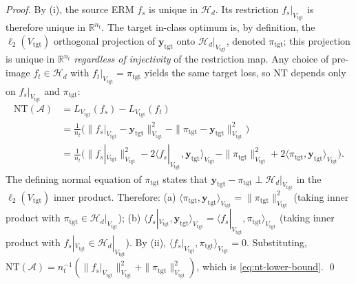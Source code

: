 \documentclass[11pt,a4paper]{article}
\theoremstyle{plain}
\theoremstyle{definition}
\theoremstyle{remark}
\newcommand{\by}{\mathbf{y}}
\newcommand{\R}{\mathbb{R}}
\newcommand{\Acal}{\mathcal{A}}
\newcommand{\Hcal}{\mathcal{H}}
\begin{document}
\begin{proof}
By (i), the source ERM $f_s$ is unique in $\Hcal_d$. Its
restriction $f_s|_{V_{\mathrm{tgt}}}$ is therefore unique in
$\R^{n_t}$. The target in-class optimum is, by definition, the
$\ell_2(V_{\mathrm{tgt}})$ orthogonal projection of
$\by_{\mathrm{tgt}}$ onto $\Hcal_d|_{V_{\mathrm{tgt}}}$, denoted
$\pi_{\mathrm{tgt}}$; this projection is unique in $\R^{n_t}$
\emph{regardless of injectivity} of the restriction map. Any
choice of pre-image $f_t \in \Hcal_d$ with $f_t|_{V_{\mathrm{tgt}}}
= \pi_{\mathrm{tgt}}$ yields the same target loss, so $\mathrm{NT}$
depends only on $f_s|_{V_{\mathrm{tgt}}}$ and $\pi_{\mathrm{tgt}}$:
\begin{align*}
    \mathrm{NT}(\Acal)
    &= L_{V_{\mathrm{tgt}}}(f_s) - L_{V_{\mathrm{tgt}}}(f_t)\\
    &= \frac{1}{n_t}\Big(
        \|f_s|_{V_{\mathrm{tgt}}} - \by_{\mathrm{tgt}}\|^2_{V_{\mathrm{tgt}}}
        - \|\pi_{\mathrm{tgt}} - \by_{\mathrm{tgt}}\|^2_{V_{\mathrm{tgt}}}
        \Big)\\
    &= \frac{1}{n_t}\Big(
        \|f_s|_{V_{\mathrm{tgt}}}\|^2_{V_{\mathrm{tgt}}}
        - 2\langle f_s|_{V_{\mathrm{tgt}}}, \by_{\mathrm{tgt}}\rangle_{V_{\mathrm{tgt}}}
        - \|\pi_{\mathrm{tgt}}\|^2_{V_{\mathrm{tgt}}}
        + 2\langle \pi_{\mathrm{tgt}}, \by_{\mathrm{tgt}}\rangle_{V_{\mathrm{tgt}}}
        \Big).
\end{align*}
The defining normal equation of $\pi_{\mathrm{tgt}}$ states that
$\by_{\mathrm{tgt}} - \pi_{\mathrm{tgt}} \perp
\Hcal_d|_{V_{\mathrm{tgt}}}$ in the
$\ell_2(V_{\mathrm{tgt}})$ inner product. Therefore:
(a) $\langle \pi_{\mathrm{tgt}}, \by_{\mathrm{tgt}}
    \rangle_{V_{\mathrm{tgt}}}
    = \|\pi_{\mathrm{tgt}}\|^2_{V_{\mathrm{tgt}}}$ (taking
    inner product with $\pi_{\mathrm{tgt}} \in
    \Hcal_d|_{V_{\mathrm{tgt}}}$);
(b) $\langle f_s|_{V_{\mathrm{tgt}}}, \by_{\mathrm{tgt}}
    \rangle_{V_{\mathrm{tgt}}}
    = \langle f_s|_{V_{\mathrm{tgt}}}, \pi_{\mathrm{tgt}}
    \rangle_{V_{\mathrm{tgt}}}$ (taking inner product with
    $f_s|_{V_{\mathrm{tgt}}} \in \Hcal_d|_{V_{\mathrm{tgt}}}$).
By (ii), $\langle f_s|_{V_{\mathrm{tgt}}}, \pi_{\mathrm{tgt}}
\rangle_{V_{\mathrm{tgt}}} = 0$. Substituting,
$\mathrm{NT}(\Acal) = n_t^{-1}(
\|f_s|_{V_{\mathrm{tgt}}}\|^2_{V_{\mathrm{tgt}}}
+ \|\pi_{\mathrm{tgt}}\|^2_{V_{\mathrm{tgt}}})$,
which is \eqref{eq:nt-lower-bound}. \qed
\end{proof}
\end{document}
